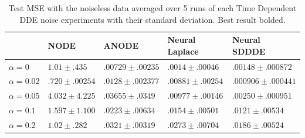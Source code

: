 \begin{table}[H]
\begin{center}
\begin{small}
\begin{tabular}{lllll}
\toprule
& NODE & ANODE & Neural Laplace & Neural SDDDE \\
\midrule
$\alpha=0$ & $1.01 \pm .435$ & $.00729 \pm .00235$ & $.0014 \pm .00046$ & $\mathbf{.00148 \pm  .000872}$ \\
$\alpha=0.02$ & $.720 \pm .00254$ & $.0128 \pm .002377$ & $.00881 \pm .00254$ & $\mathbf{.000906 \pm .000441}$ \\
$\alpha=0.05$ & $4.032 \pm 4.225$ & $.03655 \pm .0349$ & $.00977 \pm .00146$ & $\mathbf{.00250 \pm .000951}$ \\
$\alpha=0.1$ & $1.597 \pm 1.100$ & $.0223 \pm .00634$ & $.0154 \pm .00501$ & $\mathbf{.0121 \pm .00534}$ \\
$\alpha=0.2$ & $1.02 \pm .282$ & $.0321 \pm .00319$ & $.0273 \pm .00704$ & $\mathbf{.0186 \pm .00524}$ \\
\bottomrule
\end{tabular}
\end{small}
\caption{Test MSE with the noiseless data averaged over 5 runs of each Time Dependent DDE noise experiments with their standard deviation. Best result bolded.}
\label{noiseless_mse}
\end{center}
\end{table}
